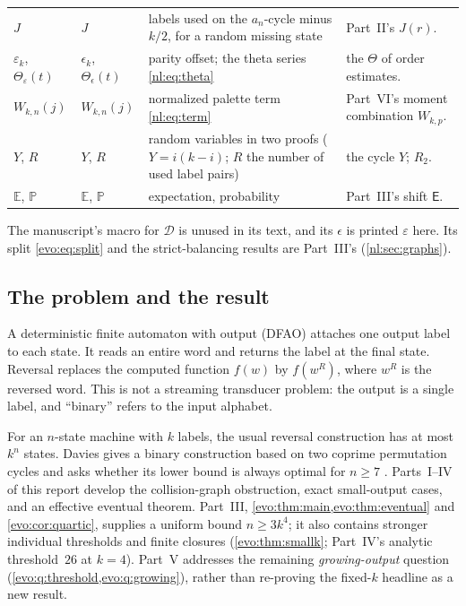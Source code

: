 \documentclass[11pt,a4paper]{article}
\numberwithin{equation}{section}
\theoremstyle{definition}
\theoremstyle{remark}
\begin{document}
{\begin{longtable}{>{\raggedright}p{.15\linewidth}>{\raggedright}p{.17\linewidth}>{\raggedright}p{.30\linewidth}>{\raggedright\arraybackslash}p{.26\linewidth}}
$J$ & $J$ & labels used on the $a_n$-cycle minus $k/2$, for a random missing state & Part~II's $J(r)$.\\
$\varepsilon_k$, $\Theta_\varepsilon(t)$ & $\epsilon_k$, $\Theta_\epsilon(t)$ & parity offset; the theta series \eqref{nl:eq:theta} & the $\Theta$ of order estimates.\\
$W_{k,n}(j)$ & $W_{k,n}(j)$ & normalized palette term \eqref{nl:eq:term} & Part~VI's moment combination $W_{k,p}$.\\
$Y$, $R$ & $Y$, $R$ & random variables in two proofs ($Y=i(k-i)$; $R$ the number of used label pairs) & the cycle $Y$; $R_2$.\\
$\mathbb E$, $\mathbb P$ & $\mathbb E$, $\mathbb P$ & expectation, probability & Part~III's shift $\mathsf E$.\\
\end{longtable}}

The manuscript's macro for $\mathcal D$ is unused in its text, and its
$\epsilon$ is printed $\varepsilon$ here. Its split
\eqref{evo:eq:split} and the strict-balancing results are Part~III's
(\cref{nl:sec:graphs}).

\subsection{The problem and the result}\label{nl:sec:problem}

A deterministic finite automaton with output (DFAO) attaches one output label
to each state. It reads an entire word and returns the label at the final
state. Reversal replaces the computed function $f(w)$ by $f(w^R)$, where
$w^R$ is the reversed word. This is not a streaming transducer problem:
the output is a single label, and ``binary'' refers to the input alphabet.

For an $n$-state machine with $k$ labels, the usual reversal construction
has at most $k^n$ states. Davies gives a binary construction based on two
coprime permutation cycles and asks whether its lower bound is always
optimal for $n\ge7$ \cite[Theorem~3, Corollary~3, Section~5, Problem~2]{Davies2017}.
Parts~I--IV of this report develop the collision-graph obstruction,
exact small-output cases, and an effective eventual theorem. Part~III,
\cref{evo:thm:main,evo:thm:eventual} and \cref{evo:cor:quartic}, supplies a
uniform bound $n\ge3k^4$; it also contains stronger individual thresholds
and finite closures (\cref{evo:thm:smallk}; Part~IV's analytic threshold~$26$
at $k=4$). Part~V addresses the remaining \emph{growing-output}
question (\cref{evo:q:threshold,evo:q:growing}), rather than re-proving the
fixed-$k$ headline as a new result.
\end{document}
